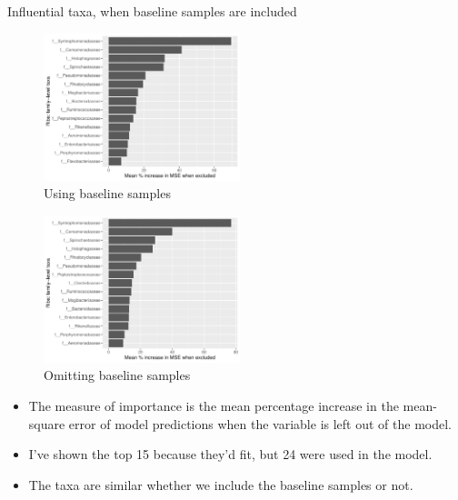 \documentclass{beamer}
\begin{document}
\begin{frame}{Influential taxa, when baseline samples are included}

  \begin{minipage}{0.47\textwidth}
    \begin{figure}
    \includegraphics[width=2.25in]{HenleyLake/bacteria/use_families/w_ribs/w_baseline/families_rib_PercIncMSE_barchart}
    \caption{{\tiny Using baseline samples}}
\end{figure}
\end{minipage}
\begin{minipage}{0.47\textwidth}
  \begin{figure}
    \includegraphics[width=2.25in]{HenleyLake/bacteria/use_families/w_ribs/no_baseline/families_rib_no_baseline_PercIncMSE_barchart}
    \caption{{\tiny Omitting baseline samples}}
  \end{figure}
  \end{minipage}
  \vspace{0.1in}
  {\scriptsize
  \begin{itemize}
  \item The measure of importance is the mean percentage increase in the
    mean-square error of model predictions when the variable is left out of the
    model. 
  \item I've shown the top 15 because they'd fit, but 24 were used in the model.
  \item The taxa are similar whether we include the baseline samples or not.
  \end{itemize}
  }

\end{frame}
\end{document}
